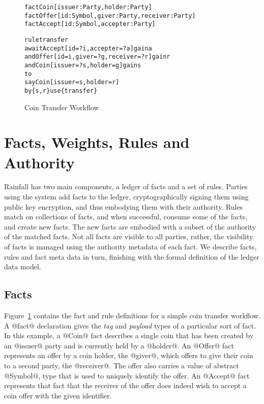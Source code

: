 
\clearpage{}


\begin{figure}
\begin{small}
\begin{alltt}
fact  Coin   [issuer: Party, holder: Party]
fact  Offer  [id: Symbol, giver: Party, receiver: Party]
fact  Accept [id: Symbol, accepter: Party]

rule  transfer
await Accept [id = ?i, accepter = ?a]  gain a
  and Offer  [id = i,  giver = ?g, receiver = ?r] gain r
  and Coin   [issuer = ?s, holder = g] gain s
to
  say Coin   [issuer = s, holder = r]
   by \{s, r\} use \{transfer\}
\end{alltt}
\end{small}
\caption{Coin Transfer Workflow}
\label{f:CoinTransfer}
\end{figure}


\section{Facts, Weights, Rules and Authority}
Rainfall has two main components, a ledger of facts and a set of rules. Parties using the system add facts to the ledger, cryptographically signing them using public key encryption, and thus embodying them with their authority. Rules match on collections of facts, and when successful, consume some of the facts, and create new facts. The new facts are embodied with a subset of the authority of the matched facts. Not all facts are visible to all parties, rather, the visibility of facts is managed using the authority metadata of each fact. We describe facts, rules and fact meta data in turn, finishing with the formal definition of the ledger data model.


\subsection{Facts}
\label{s:Facts}
Figure~\ref{f:CoinTransfer} contains the fact and rule definitions for a simple coin transfer workflow. A @fact@ declaration gives the \emph{tag} and \emph{payload} types of a particular sort of fact. In this example, a @Coin@ fact describes a single coin that has been created by an @issuer@ party and is currently held by a @holder@. An @Offer@ fact represents an offer by a coin holder, the @giver@, which offers to give their coin to a second party, the @receiver@. The offer also carries a value of abstract @Symbol@, type that is used to uniquely identify the offer. An @Accept@ fact represents that fact that the receiver of the offer does indeed wish to accept a coin offer with the given identifier.

